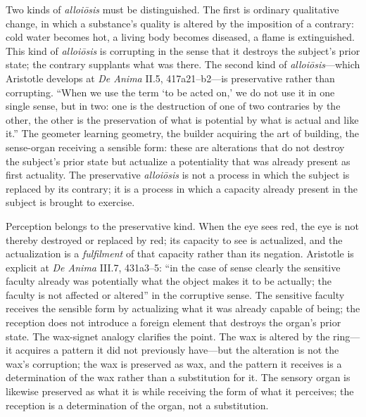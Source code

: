 \documentclass[12pt]{article}
\begin{document}
Two kinds of \textit{alloiōsis} must be distinguished. The first is ordinary qualitative change, in which a substance's quality is altered by the imposition of a contrary: cold water becomes hot, a living body becomes diseased, a flame is extinguished. This kind of \textit{alloiōsis} is corrupting in the sense that it destroys the subject's prior state; the contrary supplants what was there. The second kind of \textit{alloiōsis}---which Aristotle develops at \textit{De Anima} II.5, 417a21--b2---is preservative rather than corrupting. ``When we use the term `to be acted on,' we do not use it in one single sense, but in two: one is the destruction of one of two contraries by the other, the other is the preservation of what is potential by what is actual and like it.'' The geometer learning geometry, the builder acquiring the art of building, the sense-organ receiving a sensible form: these are alterations that do not destroy the subject's prior state but actualize a potentiality that was already present as first actuality. The preservative \textit{alloiōsis} is not a process in which the subject is replaced by its contrary; it is a process in which a capacity already present in the subject is brought to exercise.

Perception belongs to the preservative kind. When the eye sees red, the eye is not thereby destroyed or replaced by red; its capacity to see is actualized, and the actualization is a \textit{fulfilment} of that capacity rather than its negation. Aristotle is explicit at \textit{De Anima} III.7, 431a3--5: ``in the case of sense clearly the sensitive faculty already was potentially what the object makes it to be actually; the faculty is not affected or altered'' in the corruptive sense. The sensitive faculty receives the sensible form by actualizing what it was already capable of being; the reception does not introduce a foreign element that destroys the organ's prior state. The wax-signet analogy clarifies the point. The wax is altered by the ring---it acquires a pattern it did not previously have---but the alteration is not the wax's corruption; the wax is preserved as wax, and the pattern it receives is a determination of the wax rather than a substitution for it. The sensory organ is likewise preserved as what it is while receiving the form of what it perceives; the reception is a determination of the organ, not a substitution.
\end{document}
